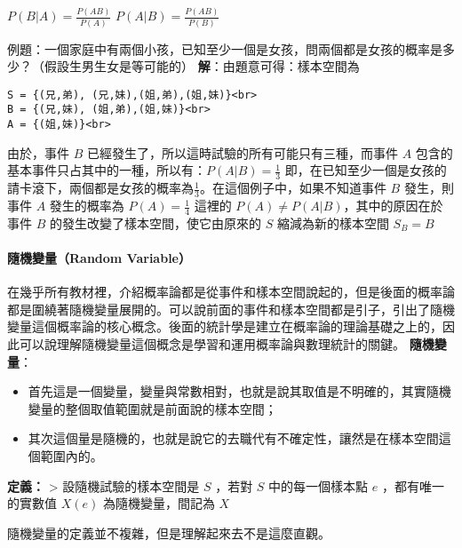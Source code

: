 \documentclass[11pt]{article}
\providecommand{\tightlist}{%
      \setlength{\itemsep}{0pt}\setlength{\parskip}{0pt}}
\begin{document}
    \(P(B|A) = \frac{P(AB)}{P(A)}\) \(P(A|B) = \frac{P(AB)}{P(B)}\)

    例題：一個家庭中有兩個小孩，已知至少一個是女孩，問兩個都是女孩的概率是多少？（假設生男生女是等可能的）
\textbf{解}：由題意可得：樣本空間為

\begin{verbatim}
S = {(兄,弟), (兄,妹),(姐,弟),(姐,妹)}<br>
B = {(兄,妹), (姐,弟),(姐,妹)}<br>
A = {(姐,妹)}<br>
\end{verbatim}

由於，事件 \(B\) 已經發生了，所以這時試驗的所有可能只有三種，而事件
\(A\) 包含的基本事件只占其中的一種，所以有：\(P(A|B) = \frac{1}{3}\)
即，在已知至少一個是女孩的請卡滾下，兩個都是女孩的概率為\(\frac{1}{3}\)。在這個例子中，如果不知道事件
\(B\) 發生，則事件 \(A\) 發生的概率為 \(P(A) = \frac{1}{4}\) 這裡的
\(P(A) \neq P(A|B)\)，其中的原因在於事件 \(B\)
的發生改變了樣本空間，使它由原來的 \(S\) 縮減為新的樣本空間 \(S_B = B\)

    \hypertarget{ux96a8ux6a5fux8b8aux91cfrandom-variable}{%
\paragraph{隨機變量（Random
Variable）}\label{ux96a8ux6a5fux8b8aux91cfrandom-variable}}

在幾乎所有教材裡，介紹概率論都是從事件和樣本空間說起的，但是後面的概率論都是圍繞著隨機變量展開的。可以說前面的事件和樣本空間都是引子，引出了隨機變量這個概率論的核心概念。後面的統計學是建立在概率論的理論基礎之上的，因此可以說理解隨機變量這個概念是學習和運用概率論與數理統計的關鍵。
\textbf{隨機變量}：

\begin{itemize}
\tightlist
\item
  首先這是一個變量，變量與常數相對，也就是說其取值是不明確的，其實隨機變量的整個取值範圍就是前面說的樣本空間；
\item
  其次這個量是隨機的，也就是說它的去職代有不確定性，讓然是在樣本空間這個範圍內的。
\end{itemize}

    \textbf{定義：} \textgreater{} 設隨機試驗的樣本空間是 \(S\) ，若對 \(S\)
中的每一個樣本點 \(e\) ，都有唯一的實數值 \(X(e)\) 為隨機變量，間記為
\(X\)

    隨機變量的定義並不複雜，但是理解起來去不是這麼直觀。
\end{document}
